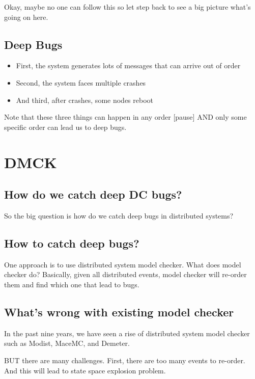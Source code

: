 Okay, maybe no one can follow this so let step back to see a big picture what's
going on here.

\subsection{Deep Bugs}

\begin{itemize}
\item First, the system generates lots of messages that can arrive out of order
\item Second, the system faces multiple crashes
\item And third, after crashes, some nodes reboot
\end{itemize}

Note that these three things can happen in any order [pause] AND only some
specific order can lead us to deep bugs.

\section{DMCK}

\subsection{How do we catch deep DC bugs?}

So the big question is how do we catch deep bugs in distributed systems?

\subsection{How to catch deep bugs?}

One approach is to use distributed system model checker. What does model checker
do? Basically, given all distributed events, model checker will re-order them
and find which one that lead to bugs.

\subsection{What's wrong with existing model checker}

In the past nine years, we have seen a rise of distributed system model checker
such as Modist, MaceMC, and Demeter. 

BUT there are many challenges. First, there are too many events to re-order.
And this will lead to state space explosion problem. 

